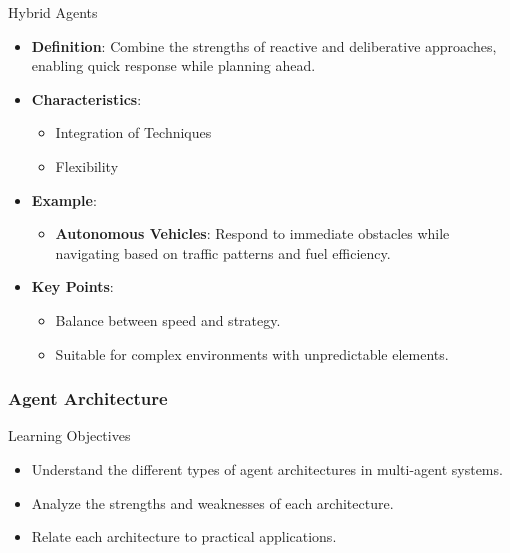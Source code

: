 \documentclass[aspectratio=169]{beamer}
\begin{document}
\begin{frame}[fragile]
    \begin{block}{Hybrid Agents}
        \begin{itemize}
            \item \textbf{Definition}: Combine the strengths of reactive and deliberative approaches, enabling quick response while planning ahead.
            \item \textbf{Characteristics}:
                \begin{itemize}
                    \item Integration of Techniques
                    \item Flexibility
                \end{itemize}
            \item \textbf{Example}: 
                \begin{itemize}
                    \item \textbf{Autonomous Vehicles}: Respond to immediate obstacles while navigating based on traffic patterns and fuel efficiency.
                \end{itemize}
            \item \textbf{Key Points}:
                \begin{itemize}
                    \item Balance between speed and strategy.
                    \item Suitable for complex environments with unpredictable elements.
                \end{itemize}
        \end{itemize}
    \end{block}
\end{frame}

\begin{frame}[fragile]
    \frametitle{Agent Architecture}
    \begin{block}{Learning Objectives}
        \begin{itemize}
            \item Understand the different types of agent architectures in multi-agent systems.
            \item Analyze the strengths and weaknesses of each architecture.
            \item Relate each architecture to practical applications.
        \end{itemize}
    \end{block}
\end{frame}
\end{document}
